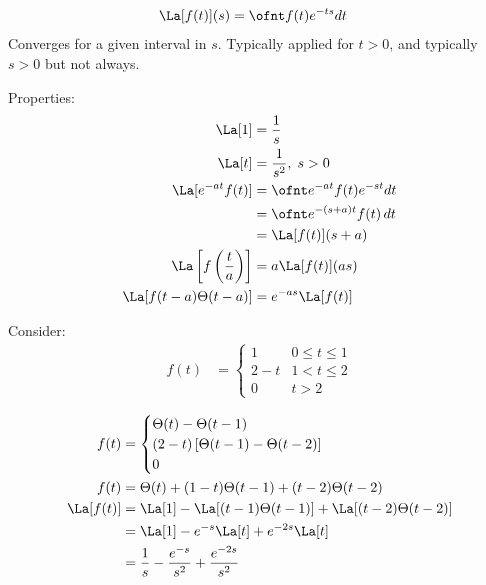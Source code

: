 \documentclass[cplx.tex]{subfiles}
\begin{document}
\chapter{}
\begin{align}
    \La[f(t)](s) &= \ofnt f(t)e^{-ts}dt
\end{align}
Converges for a given interval in $s$. 
Typically applied for $t>0$, and typically $s>0$ but not always.

Properties:
\begin{align}
    \La[1] &= \frac1s \\
    \La[t] &= \frac{1}{s^2},\;s>0 \\
    \La[e^{-at}f(t)] &= \ofnt e^{-at}f(t)e^{-st}dt \\
                     &= \ofnt e^{-(s+a)t}f(t)\,dt \\
                     &= \La[f(t)](s+a) \\
    \La\left[f\left(\frac{t}{a}\right)\right] &= a\La[f(t)](as) \\
    \La[f(t-a)\Theta(t-a)] &= e^{-as}\La[f(t)]
\end{align}

Consider:
\begin{align}
    f(t) &= \begin{cases} 1 & 0\leq t\leq 1 \\ 2-t & 1 < t \leq 2 \\ 0 & t>2\end{cases}
\end{align}
\begin{center}
\end{center}
\begin{align}
    f(t) &= \begin{cases} \Theta(t)-\Theta(t-1) \\ (2-t)\left[\Theta(t-1)-\Theta(t-2)\right] \\ 0\end{cases} \\
    f(t) &= \Theta(t) + (1-t)\Theta(t-1) + (t-2)\Theta(t-2) \\
    \La[f(t)] &= \La[1] - \La[(t-1)\Theta(t-1)] + \La[(t-2)\Theta(t-2)] \\
              &= \La[1] - e^{-s}\La[t] + e^{-2s}\La[t] \\
              &= \frac1s - \frac{e^{-s}}{s^2} + \frac{e^{-2s}}{s^2}
\end{align}
\end{document}
